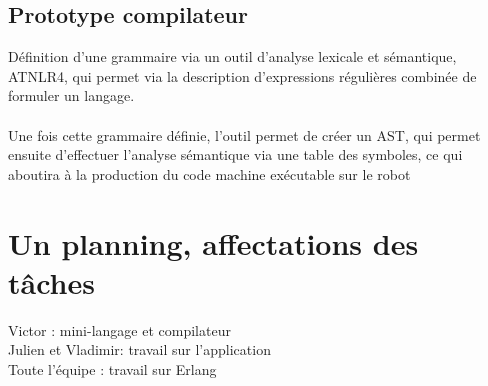 \documentclass[a4paper]{article}
\begin{document}
\subsection{Prototype compilateur}
Définition d’une grammaire via un outil d’analyse lexicale et sémantique, ATNLR4, qui permet via la description d’expressions régulières combinée de formuler un langage.\\
\\
Une fois cette grammaire définie, l’outil permet de créer un AST, qui permet ensuite d’effectuer l’analyse sémantique via une table des symboles, ce qui aboutira à la production du code machine exécutable sur le robot
\section{Un planning, affectations des tâches}
Victor : mini-langage et compilateur\\
Julien et Vladimir: travail sur l’application\\
Toute l’équipe : travail sur Erlang\\


\end{document}
